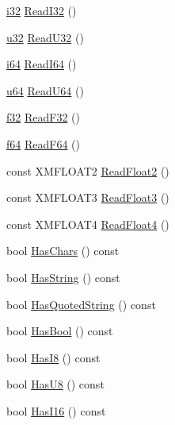 \begin{DoxyCompactItemize}
\hyperlink{namespacemage_ad59a7dbc22c51c308b6df9e9c3cafd62}{i32} \hyperlink{classmage_1_1_line_reader_a49d783b3481a2e25a36477510cef627a}{Read\+I32} ()
\item 
\hyperlink{namespacemage_af2b398bf98eb10351f49cad73fe2cc73}{u32} \hyperlink{classmage_1_1_line_reader_adafd8e02ca717582e675d73ccd20ffbb}{Read\+U32} ()
\item 
\hyperlink{namespacemage_a3d629c1ab28148a782661e5b14b6fe5e}{i64} \hyperlink{classmage_1_1_line_reader_ae72be27dd23886104099f8cf2e2a162a}{Read\+I64} ()
\item 
\hyperlink{namespacemage_aee97da48a07394dd617c9deb60ed2064}{u64} \hyperlink{classmage_1_1_line_reader_a2ec680fb812d61e21cf0a4f0bbb35460}{Read\+U64} ()
\item 
\hyperlink{namespacemage_a6a44ad388483959dc4dff9f2aef91431}{f32} \hyperlink{classmage_1_1_line_reader_a66b8417d2b2fd3c95579c814caa5de04}{Read\+F32} ()
\item 
\hyperlink{namespacemage_ab935747c6941320bd6214b5a5f265b09}{f64} \hyperlink{classmage_1_1_line_reader_a9c020285175b2771d7106d2354aa1974}{Read\+F64} ()
\item 
const X\+M\+F\+L\+O\+A\+T2 \hyperlink{classmage_1_1_line_reader_ae33effd33fad465616e3acf8acdc408f}{Read\+Float2} ()
\item 
const X\+M\+F\+L\+O\+A\+T3 \hyperlink{classmage_1_1_line_reader_a7a605a7c2402051f1ca4fda1e543fc28}{Read\+Float3} ()
\item 
const X\+M\+F\+L\+O\+A\+T4 \hyperlink{classmage_1_1_line_reader_aaa21896aa756c3402cfeb207ef5f2029}{Read\+Float4} ()
\item 
bool \hyperlink{classmage_1_1_line_reader_a7eb54d60902d1fb7846ea5c566312a0f}{Has\+Chars} () const
\item 
bool \hyperlink{classmage_1_1_line_reader_a011b5a0d1bd2d157033e3bf7d7323aed}{Has\+String} () const
\item 
bool \hyperlink{classmage_1_1_line_reader_ac92de9a3d986c7031c902c9489cfaa5a}{Has\+Quoted\+String} () const
\item 
bool \hyperlink{classmage_1_1_line_reader_ac18069cc6bc399ce6ad8ad069a073c6c}{Has\+Bool} () const
\item 
bool \hyperlink{classmage_1_1_line_reader_a7b7f4e920ac61ca189724ff4a1885738}{Has\+I8} () const
\item 
bool \hyperlink{classmage_1_1_line_reader_a2366e6732f404890a54573fd009530aa}{Has\+U8} () const
\item 
bool \hyperlink{classmage_1_1_line_reader_a1a2ad396e48bf2db424f327141cd75e9}{Has\+I16} () const

\end{DoxyCompactItemize}
